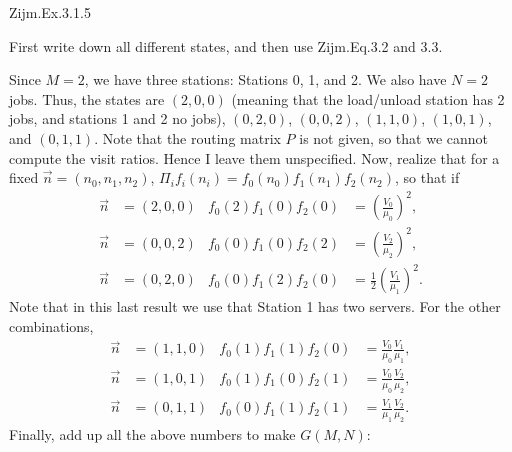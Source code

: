 \begin{exercise}
Zijm.Ex.3.1.5
\begin{hint}
 First write down all  different states, and then use Zijm.Eq.3.2 and 3.3.
\end{hint}
\begin{solution}
  Since $M=2$, we have three stations: Stations 0, 1, and 2. We also
  have $N=2$ jobs. Thus, the states are $(2,0,0)$ (meaning that the
  load/unload station has 2 jobs, and stations 1 and 2 no jobs),
  $(0,2,0)$, $(0,0,2)$, $(1,1,0)$, $(1,0,1)$, and $(0,1,1)$. Note that
  the routing matrix $P$ is not given, so that we cannot compute the
  visit ratios. Hence I leave them unspecified. Now, realize that for
  a fixed $\vec n=(n_0, n_1, n_2)$,
  $\Pi_i f_i(n_i) = f_0(n_0)f_1(n_1)f_2(n_2)$, so that if 
  \begin{align*}
    \vec n &= (2,0,0) & f_0(2)f_1(0)f_2(0) &= \left(\frac{V_0}{\mu_0}\right)^2, \\
    \vec n &= (0,0,2) & f_0(0)f_1(0)f_2(2) &= \left(\frac{V_2}{\mu_2}\right)^2, \\
    \vec n &= (0,2,0) & f_0(0)f_1(2)f_2(0) &= \frac12\left(\frac{V_1}{\mu_1}\right)^2.
  \end{align*}
  Note that in this last result we use that Station 1 has two servers. For the other combinations, 
  \begin{align*}
    \vec n &= (1,1,0) & f_0(1)f_1(1)f_2(0) &= \frac{V_0}{\mu_0}\frac{V_1}{\mu_1}, \\
    \vec n &= (1,0,1) & f_0(1)f_1(0)f_2(1) &= \frac{V_0}{\mu_0}\frac{V_2}{\mu_2}, \\
    \vec n &= (0,1,1) & f_0(0)f_1(1)f_2(1) &= \frac{V_1}{\mu_1}\frac{V_2}{\mu_2}.
  \end{align*}
Finally, add up all the above numbers to make $G(M,N)$: 
\end{solution}
\end{exercise}





